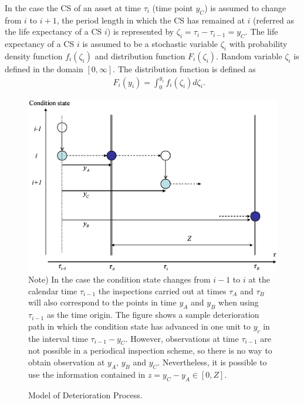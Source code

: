 In the case the CS of an asset at time $\tau_{i}$ (time point $y_C$) is assumed to change from $i$ to $i+1$, the period length in which the CS has remained at $i$ (referred as the life expectancy of a CS $i$) is represented by $\zeta_i=\tau_{i}-\tau_{i-1}=y_C$. The life expectancy of a CS $i$ is assumed to be a stochastic variable $\zeta_i$ with probability density function $f_i(\zeta_i)$ and distribution function $F_i(\zeta_i)$. Random variable $\zeta_i$ is defined in the domain $[0,\infty]$. The distribution function is defined as
\begin{eqnarray}
&& F_i(y_i)=\int_0^{y_i}f_i(\zeta_i)d\zeta_i. \label{func21}
\end{eqnarray}
\begin{figure}[!htb]
		\includegraphics[scale=0.4]{figures/transitioncs02.eps} \\
	\footnotesize Note) In the case the condition state changes from $i-1$ to $i$ at the calendar time $\tau_{i-1}$ the inspections carried out at times $\tau_A$ and $\tau_B$ will also correspond to the points in time $y_A$ and $y_B$ when using $\tau_{i-1}$ as the time origin. The figure shows a sample deterioration path in which the condition state has advanced in one unit to $y_c$ in the interval time $\tau_{i-1}-y_C$. However, observations at time $\tau_{i-1}$ are not possible in a periodical inspection scheme, so there is no way to obtain observation at $y_A$, $y_B$ and $y_C$. Nevertheless, it is possible to use the information contained in $z=y_C-y_A \in [0,Z]$.
	\caption{Model of Deterioration Process.}
	\label{transitioncs02} 
\end{figure}

